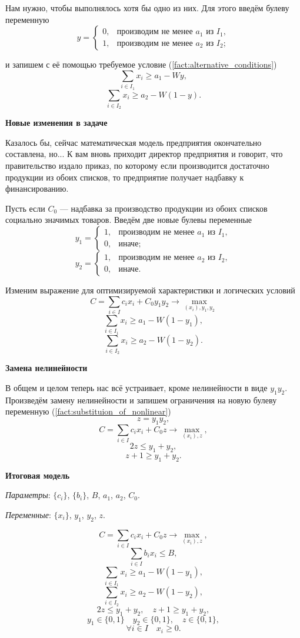 Нам нужно, чтобы выполнялось хотя бы одно из них. Для этого введём булеву переменную
\[
y = \begin{cases}
	0, & \text{производим не менее $a_1$ из $I_1$}, \\
	1, & \text{производим не менее $a_2$ из $I_2$};
\end{cases}
\]

и запишем с её помощью требуемое условие (\cref{fact:alternative_conditions})
\[
\sum_{i \in I_1} x_i \ge a_1 - Wy,
\]
\[
\sum_{i \in I_2} x_i \ge a_2 - W(1 - y).
\]

\textbf{Новые изменения в задаче}

Казалось бы, сейчас математическая модель предприятия окончательно составлена, но... К вам вновь приходит директор предприятия и говорит, что правительство издало приказ, по которому если производится достаточно продукции из обоих списков, то предприятие получает надбавку к финансированию.

Пусть если $C_0$ --- надбавка за производство продукции из обоих списков социально значимых товаров. Введём две новые булевы переменные
\[
y_1 = \begin{cases}
	1, & \text{производим не менее $a_1$ из $I_1$}, \\
	0, & \text{иначе};
\end{cases}
\]
\[
y_2 = \begin{cases}
	1, & \text{производим не менее $a_2$ из $I_2$}, \\
	0, & \text{иначе}.
\end{cases}
\]

Изменим выражение для оптимизируемой характеристики и логических условий
\[
C = \sum_{i \in I}c_i x_i + C_0 y_1 y_2 \to \max_{(x_i), y_1, y_2}
\]
\[
\sum_{i \in I_1} x_i \ge a_1 - W(1 - y_1),
\]
\[
\sum_{i \in I_2} x_i \ge a_2 - W(1 - y_2).
\]

\textbf{Замена нелинейности}

В общем и целом теперь нас всё устраивает, кроме нелинейности в виде $y_1 y_2$. Произведём замену нелинейности и запишем ограничения на новую булеву переменную (\cref{fact:substituion_of_nonlinear})
\[
z = y_1 y_2,
\]
\[
C = \sum_{i \in I}c_i x_i + C_0 z \to \max_{(x_i), z},
\]
\[
2z \le y_1 + y_2,
\]
\[
z + 1 \ge y_1 + y_2.
\]

\textbf{Итоговая модель}

\textit{Параметры}: $\{c_i\}$, $\{b_i\}$, $B$, $a_1$, $a_2$, $C_0$.

\textit{Переменные}: $\{x_i\}$, $y_1$, $y_2$, $z$.

\[
C = \sum_{i \in I}c_i x_i + C_0 z \to \max_{(x_i), z},
\]
\[
\sum_{i \in I}b_i x_i \le B,
\]
\[
\sum_{i \in I_1} x_i \ge a_1 - W(1 - y_1),
\]
\[
\sum_{i \in I_2} x_i \ge a_2 - W(1 - y_2),
\]
\[
2z \le y_1 + y_2, \quad z + 1 \ge y_1 + y_2,
\]
\[
y_1 \in \{0, 1\} \quad y_2 \in \{0, 1\}, \quad z \in \{0, 1\},
\]
\[
\forall i \in I \quad x_i \ge 0.
\]
